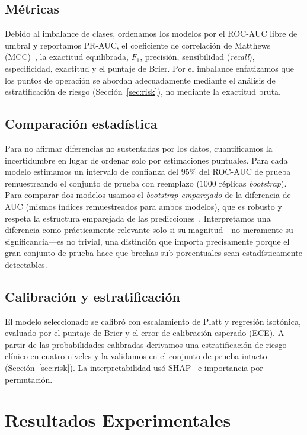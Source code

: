\documentclass[conference]{IEEEtran}
\begin{document}
\subsection{Métricas}
Debido al imbalance de clases, ordenamos los modelos por el ROC-AUC libre de umbral y
reportamos PR-AUC, el coeficiente de correlación de Matthews (MCC)~\cite{chicco2020mcc}, la
exactitud equilibrada, $F_1$, precisión, sensibilidad (\emph{recall}), especificidad,
exactitud y el puntaje de Brier. Por el imbalance enfatizamos que los puntos de operación se
abordan adecuadamente mediante el análisis de estratificación de riesgo
(Sección~\ref{sec:risk}), no mediante la exactitud bruta.

\subsection{Comparación estadística}
Para no afirmar diferencias no sustentadas por los datos, cuantificamos la incertidumbre en
lugar de ordenar solo por estimaciones puntuales. Para cada modelo estimamos un intervalo de
confianza del $95\%$ del ROC-AUC de prueba remuestreando el conjunto de prueba con reemplazo
($1000$ réplicas \emph{bootstrap}). Para comparar dos modelos usamos el \emph{bootstrap
emparejado} de la diferencia de AUC (mismos índices remuestreados para ambos modelos), que
es robusto y respeta la estructura emparejada de las
predicciones~\cite{demsar2006statistical}. Interpretamos una diferencia como
prácticamente relevante solo si su magnitud---no meramente su significancia---es no
trivial, una distinción que importa precisamente porque el gran conjunto de prueba hace que
brechas sub-porcentuales sean estadísticamente detectables.

\subsection{Calibración y estratificación}
El modelo seleccionado se calibró con escalamiento de Platt y regresión isotónica, evaluado
por el puntaje de Brier y el error de calibración esperado (ECE). A partir de las
probabilidades calibradas derivamos una estratificación de riesgo clínico en cuatro niveles
y la validamos en el conjunto de prueba intacto (Sección~\ref{sec:risk}). La
interpretabilidad usó SHAP~\cite{lundberg2017shap,lundberg2020local} e importancia por
permutación.

\section{Resultados Experimentales}
\end{document}
